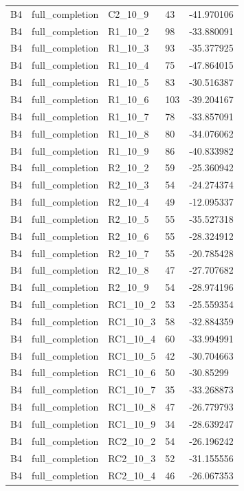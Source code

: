 \begin{longtable}{lllll}
B4 & full\_completion & C2\_10\_9 & 43 & -41.970106 \\
B4 & full\_completion & R1\_10\_2 & 98 & -33.880091 \\
B4 & full\_completion & R1\_10\_3 & 93 & -35.377925 \\
B4 & full\_completion & R1\_10\_4 & 75 & -47.864015 \\
B4 & full\_completion & R1\_10\_5 & 83 & -30.516387 \\
B4 & full\_completion & R1\_10\_6 & 103 & -39.204167 \\
B4 & full\_completion & R1\_10\_7 & 78 & -33.857091 \\
B4 & full\_completion & R1\_10\_8 & 80 & -34.076062 \\
B4 & full\_completion & R1\_10\_9 & 86 & -40.833982 \\
B4 & full\_completion & R2\_10\_2 & 59 & -25.360942 \\
B4 & full\_completion & R2\_10\_3 & 54 & -24.274374 \\
B4 & full\_completion & R2\_10\_4 & 49 & -12.095337 \\
B4 & full\_completion & R2\_10\_5 & 55 & -35.527318 \\
B4 & full\_completion & R2\_10\_6 & 55 & -28.324912 \\
B4 & full\_completion & R2\_10\_7 & 55 & -20.785428 \\
B4 & full\_completion & R2\_10\_8 & 47 & -27.707682 \\
B4 & full\_completion & R2\_10\_9 & 54 & -28.974196 \\
B4 & full\_completion & RC1\_10\_2 & 53 & -25.559354 \\
B4 & full\_completion & RC1\_10\_3 & 58 & -32.884359 \\
B4 & full\_completion & RC1\_10\_4 & 60 & -33.994991 \\
B4 & full\_completion & RC1\_10\_5 & 42 & -30.704663 \\
B4 & full\_completion & RC1\_10\_6 & 50 & -30.85299 \\
B4 & full\_completion & RC1\_10\_7 & 35 & -33.268873 \\
B4 & full\_completion & RC1\_10\_8 & 47 & -26.779793 \\
B4 & full\_completion & RC1\_10\_9 & 34 & -28.639247 \\
B4 & full\_completion & RC2\_10\_2 & 54 & -26.196242 \\
B4 & full\_completion & RC2\_10\_3 & 52 & -31.155556 \\
B4 & full\_completion & RC2\_10\_4 & 46 & -26.067353 \\

\end{longtable}
